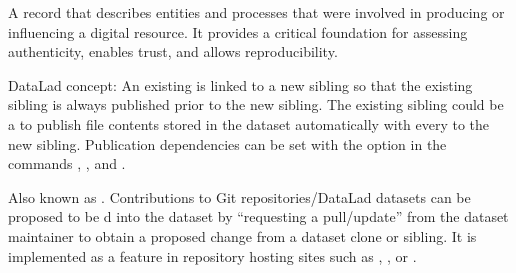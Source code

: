 \begin{description}
\sphinxAtStartPar
A record that describes entities and processes that were involved in producing or influencing
a digital resource. It provides a critical foundation for assessing authenticity, enables trust,
and allows reproducibility.

\ignorespaces 
\sphinxAtStartPar
DataLad concept: An existing {\hyperref[\detokenize{glossary:term-sibling}]{}} is linked to a new sibling
so that the existing sibling is always published prior to the new sibling.
The existing sibling could be a {\hyperref[\detokenize{glossary:term-special-remote}]{}} to publish file
contents stored in the dataset {\hyperref[\detokenize{glossary:term-annex}]{}} automatically with every
 to the new sibling. Publication dependencies can be
set with the option  in the commands
, , and
.

\ignorespaces 
\sphinxAtStartPar
Also known as {\hyperref[\detokenize{glossary:term-merge-request}]{}}. Contributions to Git repositories/DataLad datasets can be proposed to be {\hyperref[\detokenize{glossary:term-merge}]{}}d into the dataset by “requesting a pull/update” from the dataset maintainer to obtain a proposed change from a dataset clone or sibling. It is implemented as a feature in repository hosting sites such as {\hyperref[\detokenize{glossary:term-GitHub}]{}}, {\hyperref[\detokenize{glossary:term-GIN}]{}}, or {\hyperref[\detokenize{glossary:term-GitLab}]{}}.


\end{description}
